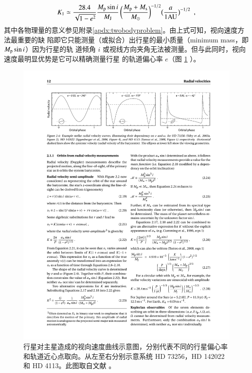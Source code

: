 \begin{equation}  \label{eq:rvk} 
K_1 \simeq \frac{28.4 }{\sqrt{1-e^2}} \frac{M_\mathrm{p}\sin i}{M_\mathrm{J}} \, \bigg(\frac{M_\mathrm{p}+M_\mathrm{s}}{M_\odot}\bigg)^{-1/2} \big(\frac{a}{1 \mathrm{AU}}\big)^{-1/2} \ \ ,
\end{equation}  %
其中各物理量的意义参见附录\ref{apdx:twobodyproblem}。由上式可知，视向速度方法最重要的缺
陷即它只能测量（或拟合）出行星的最小质量（minimum mass，即$M_\mathrm{p}\sin i$）因为行星的轨
道倾角 $i$ 或视线方向夹角无法被测量。但与此同时，视向速度最明显优势是它可以精确测量行星
的轨道偏心率 $e$（图 \ref{fig:rvcurve} ）。

\begin{figure}[h!]
\centering
\includegraphics[width=1.0\textwidth]{figures/chapter1/fig5_rvcurve.pdf}
\caption[行星对主星造成的视向速度曲线示意图，从左至右分别代表不同的行星偏心率和轨道近心点取向。此图版权归 Perryman M. 所有。]{行星对主星造成的视向速度曲线示意图，分别代表不同的行星偏心率和轨道近心点取向。从左至右分别示意系统 HD 73256\cite{Udry2003HD73256}，HD 142022\cite{Eggenberger2006HD142022} 和 HD 4113\cite{Tamuz2008HD4113}。此图取自文献 。}
\label{fig:rvcurve}
\end{figure}

